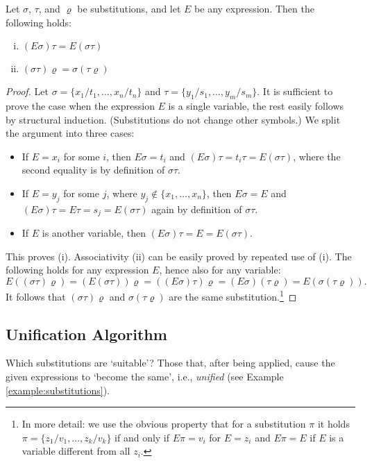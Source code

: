 \begin{proposition}
Let $\sigma$, $\tau$, and $\varrho$ be substitutions, and let $E$ be any expression. Then the following holds:
\begin{enumerate}[(i)]
    \item $(E\sigma)\tau=E(\sigma\tau)$
    \item $(\sigma\tau)\varrho=\sigma(\tau\varrho)$
\end{enumerate}
\end{proposition}

\begin{proof}
Let $\sigma=\{x_1/t_1,\dots,x_n/t_n\}$ and $\tau=\{y_1/s_1,\dots,y_m/s_m\}$. It is sufficient to prove the case when the expression $E$ is a single variable, the rest easily follows by structural induction. (Substitutions do not change other symbols.) We split the argument into three cases:
\begin{itemize}
    \item If $E=x_i$ for some $i$, then $E\sigma=t_i$ and $(E\sigma)\tau=t_i\tau=E(\sigma\tau)$, where the second equality is by definition of $\sigma\tau$.
    \item If $E=y_j$ for some $j$, where $y_j\notin\{x_1,\dots,x_n\}$, then $E\sigma=E$ and $(E\sigma)\tau=E\tau=s_j=E(\sigma\tau)$ again by definition of $\sigma\tau$.
    \item If $E$ is another variable, then $(E\sigma)\tau=E=E(\sigma\tau)$.
\end{itemize}
This proves (i). Associativity (ii) can be easily proved by repeated use of (i). The following holds for any expression $E$, hence also for any variable:
$$
E((\sigma\tau)\varrho)=(E(\sigma\tau))\varrho=((E\sigma)\tau)\varrho=(E\sigma)(\tau\varrho)=E(\sigma(\tau\varrho)).
$$
It follows that $(\sigma\tau)\varrho$ and $\sigma(\tau\varrho)$ are the same substitution.\footnote{In more detail: we use the obvious property that for a substitution $\pi$ it holds $\pi=\{z_1/v_1,\dots,z_k/v_k\}$ if and only if $E\pi=v_i$ for $E=z_i$ and $E\pi=E$ if $E$ is a variable different from all $z_i$.}
\end{proof}    

\subsection{Unification Algorithm}

Which substitutions are `suitable'? Those that, after being applied, cause the given expressions to `become the same', i.e., \emph{unified} (see Example \ref{example:substitutions}).

